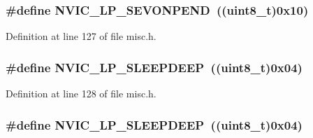 \subsubsection[{\texorpdfstring{N\+V\+I\+C\+\_\+\+L\+P\+\_\+\+S\+E\+V\+O\+N\+P\+E\+ND}{NVIC_LP_SEVONPEND}}]{\setlength{\rightskip}{0pt plus 5cm}\#define N\+V\+I\+C\+\_\+\+L\+P\+\_\+\+S\+E\+V\+O\+N\+P\+E\+ND~(({\bf uint8\+\_\+t})0x10)}\hypertarget{group___system___low___power_ga10748d2b2875afd122f6476864ad6cae}{}\label{group___system___low___power_ga10748d2b2875afd122f6476864ad6cae}


Definition at line 127 of file misc.\+h.

\subsubsection[{\texorpdfstring{N\+V\+I\+C\+\_\+\+L\+P\+\_\+\+S\+L\+E\+E\+P\+D\+E\+EP}{NVIC_LP_SLEEPDEEP}}]{\setlength{\rightskip}{0pt plus 5cm}\#define N\+V\+I\+C\+\_\+\+L\+P\+\_\+\+S\+L\+E\+E\+P\+D\+E\+EP~(({\bf uint8\+\_\+t})0x04)}\hypertarget{group___system___low___power_gaeec2d10922fa9ec5e65398667b303253}{}\label{group___system___low___power_gaeec2d10922fa9ec5e65398667b303253}


Definition at line 128 of file misc.\+h.

\subsubsection[{\texorpdfstring{N\+V\+I\+C\+\_\+\+L\+P\+\_\+\+S\+L\+E\+E\+P\+D\+E\+EP}{NVIC_LP_SLEEPDEEP}}]{\setlength{\rightskip}{0pt plus 5cm}\#define N\+V\+I\+C\+\_\+\+L\+P\+\_\+\+S\+L\+E\+E\+P\+D\+E\+EP~(({\bf uint8\+\_\+t})0x04)}\hypertarget{group___system___low___power_gaeec2d10922fa9ec5e65398667b303253}{}\label{group___system___low___power_gaeec2d10922fa9ec5e65398667b303253}


